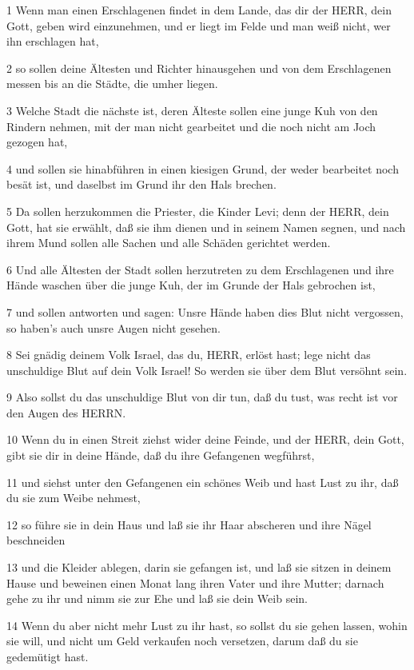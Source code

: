 \par 1 Wenn man einen Erschlagenen findet in dem Lande, das dir der HERR, dein Gott, geben wird einzunehmen, und er liegt im Felde und man weiß nicht, wer ihn erschlagen hat,
\par 2 so sollen deine Ältesten und Richter hinausgehen und von dem Erschlagenen messen bis an die Städte, die umher liegen.
\par 3 Welche Stadt die nächste ist, deren Älteste sollen eine junge Kuh von den Rindern nehmen, mit der man nicht gearbeitet und die noch nicht am Joch gezogen hat,
\par 4 und sollen sie hinabführen in einen kiesigen Grund, der weder bearbeitet noch besät ist, und daselbst im Grund ihr den Hals brechen.
\par 5 Da sollen herzukommen die Priester, die Kinder Levi; denn der HERR, dein Gott, hat sie erwählt, daß sie ihm dienen und in seinem Namen segnen, und nach ihrem Mund sollen alle Sachen und alle Schäden gerichtet werden.
\par 6 Und alle Ältesten der Stadt sollen herzutreten zu dem Erschlagenen und ihre Hände waschen über die junge Kuh, der im Grunde der Hals gebrochen ist,
\par 7 und sollen antworten und sagen: Unsre Hände haben dies Blut nicht vergossen, so haben's auch unsre Augen nicht gesehen.
\par 8 Sei gnädig deinem Volk Israel, das du, HERR, erlöst hast; lege nicht das unschuldige Blut auf dein Volk Israel! So werden sie über dem Blut versöhnt sein.
\par 9 Also sollst du das unschuldige Blut von dir tun, daß du tust, was recht ist vor den Augen des HERRN.
\par 10 Wenn du in einen Streit ziehst wider deine Feinde, und der HERR, dein Gott, gibt sie dir in deine Hände, daß du ihre Gefangenen wegführst,
\par 11 und siehst unter den Gefangenen ein schönes Weib und hast Lust zu ihr, daß du sie zum Weibe nehmest,
\par 12 so führe sie in dein Haus und laß sie ihr Haar abscheren und ihre Nägel beschneiden
\par 13 und die Kleider ablegen, darin sie gefangen ist, und laß sie sitzen in deinem Hause und beweinen einen Monat lang ihren Vater und ihre Mutter; darnach gehe zu ihr und nimm sie zur Ehe und laß sie dein Weib sein.
\par 14 Wenn du aber nicht mehr Lust zu ihr hast, so sollst du sie gehen lassen, wohin sie will, und nicht um Geld verkaufen noch versetzen, darum daß du sie gedemütigt hast.
